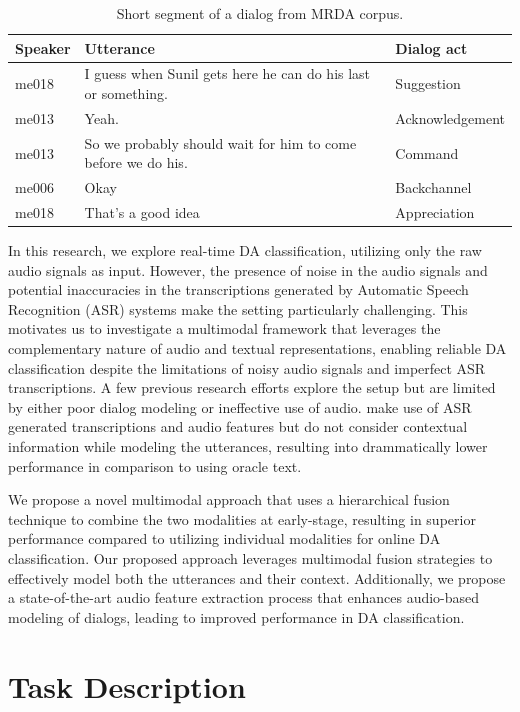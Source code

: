 \begin{table}
\centering
\small
\begin{tabularx}{\linewidth}{lXl}
\toprule
\textbf{Speaker} & \textbf{Utterance} & \textbf{Dialog act}\\
\midrule
me018 & I guess when Sunil gets here he can do his last or something. & Suggestion \\
me013 & Yeah. & Acknowledgement \\
me013 & So we probably should wait for him to come before we do his. & Command \\
me006 & Okay & Backchannel \\
me018 & That's a good idea & Appreciation \\
\bottomrule
\end{tabularx}
\caption{Short segment of a dialog from MRDA corpus.}
\label{tab:DA_example}
\end{table}

In this research, we explore real-time DA classification, utilizing only the raw audio signals as input. However, the presence of noise in the audio signals and potential inaccuracies in the transcriptions generated by Automatic Speech Recognition (ASR) systems make the setting particularly challenging. This motivates us to investigate a multimodal framework that leverages the complementary nature of audio and textual representations, enabling reliable DA classification despite the limitations of noisy audio signals and imperfect ASR transcriptions. A few previous research efforts explore the setup but are limited by either poor dialog modeling or ineffective use of audio. \cite{he2018exploring} make use of ASR generated transcriptions and audio features but do not consider contextual information while modeling the utterances,  resulting into drammatically lower performance in comparison to using oracle text. 

We propose a novel multimodal approach that uses a hierarchical fusion technique to combine the two modalities at early-stage, resulting in superior performance compared to utilizing individual modalities for online DA classification. Our proposed approach leverages multimodal fusion strategies to effectively model both the utterances and their context.
Additionally, we propose a state-of-the-art audio feature extraction process that enhances audio-based modeling of dialogs, leading to improved performance in DA classification.
 

\section{Task Description}

